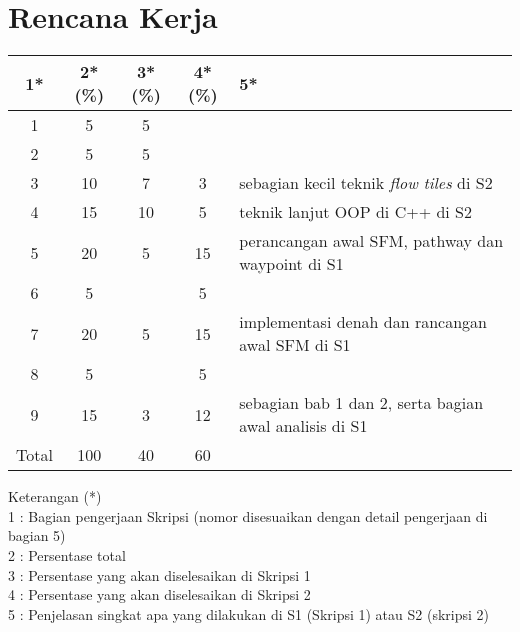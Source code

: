 \documentclass[a4paper,twoside]{article}
\begin{document}
\section{Rencana Kerja}
\begin{center}
  \begin{tabular}{ | c | c | c | c | l |}
    \hline
    1*  & 2*(\%) & 3*(\%) & 4*(\%) &5*\\ \hline \hline
    1   & 5  & 5  &  &  \\ \hline
    2   & 5 & 5  &   & \\ \hline
    3   & 10  & 7  & 3 & {\footnotesize sebagian kecil teknik {\it flow tiles} di S2}  \\ \hline
    4   & 15  & 10  &  5 & {\footnotesize teknik lanjut OOP di C++ di S2} \\ \hline
    5   & 20  & 5  & 15 & {\footnotesize perancangan awal SFM, pathway dan waypoint di S1} \\ \hline
    6   & 5 &   & 5  & \\ \hline
    7   & 20  & 5  & 15 &  {\footnotesize implementasi denah dan rancangan awal SFM di S1}\\ \hline
    8   & 5  &   &  5  & \\ \hline
    9   & 15  & 3  & 12  & {\footnotesize sebagian bab 1 dan 2, serta bagian awal analisis di S1}\\ \hline
    Total  & 100  & 40  & 60 &  \\ \hline
                          \end{tabular}
\end{center}

Keterangan (*)\\
1 : Bagian pengerjaan Skripsi (nomor disesuaikan dengan detail pengerjaan di bagian 5)\\
2 : Persentase total \\
3 : Persentase yang akan diselesaikan di Skripsi 1 \\
4 : Persentase yang akan diselesaikan di Skripsi 2 \\
5 : Penjelasan singkat apa yang dilakukan di S1 (Skripsi 1) atau S2 (skripsi 2)
\end{document}
